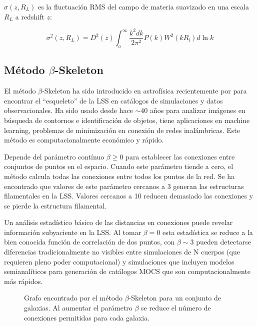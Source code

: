 \documentclass[preprint]{aastex62}
\begin{document}
  $\sigma(z,R_L)$ es la fluctuación RMS del campo de materia suavizado en una escala $R_L$ a
  redshift $z$:
  
  \begin{equation}
    \sigma^2(z,R_L) = D^2(z) \int_o^{\infty} \frac{k^2dk}{2\pi^2}P(k) W^2(kR_l)d \ln k
  \end{equation}



  \subsection{Método $\beta$-Skeleton}


  El método $\beta$-Skeleton ha sido introducido en astrofísica recientemente por \citet{Fang2018} para
  encontrar el ``esqueleto'' de la  LSS en catálogos de simulaciones y datos observacionales.
  Ha sido usado desde hace $\sim 40$ años para analizar imágenes en búsqueda de contornos e identificación
  de objetos, tiene aplicaciones en machine learning, problemas de minimización en conexión de redes
  inalámbricas. Este método es computacionalmente económico y rápido.
  
  Depende del parámetro contínuo $\beta \geq 0$ para establecer las conexiones entre conjuntos de
  puntos en el espacio. Cuando este parámetro tiende a cero, el método calcula todas las conexiones
  entre todos los puntos de la red. Se ha encontrado que valores de este parámetro cercanos a 3
  generan las estructuras filamentales en la LSS. Valores cercanos a 10 reducen demasiado las
  conexiones y se pierde la estructura filamental. 

  Un análisis estadístico básico de las distancias en conexiones puede revelar información subyaciente
  en la LSS. Al tomar $\beta = 0$ esta estadística se reduce a la bien conocida función de correlación
  de dos puntos, con $\beta \sim 3$ pueden detectarse diferencias tradicionalmente no visibles entre
  simulaciones de N cuerpos (que requieren pleno poder computacional) y simulaciones que incluyen
  modelos semianalíticos para generación de catálogos MOCS que son computacionalmente más rápidos.

  \begin{figure}
    \caption{Grafo encontrado por el método $\beta$-Skeleton para un conjunto de galaxias. Al aumentar el
      parámetro $\beta$ se reduce el número de conexiones permitidas para cada galaxia.
      \citep{https://arxiv.org/pdf/1809.00438.pdf} \label{fig:beta_skeleton_analysis}}
  \end{figure}
\end{document}
